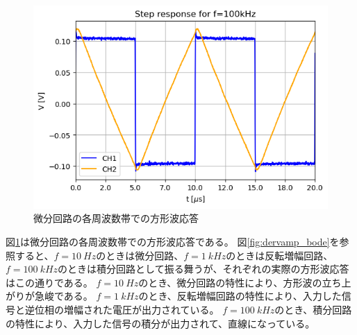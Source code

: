 \documentclass[a4paper]{ltjsarticle}
\begin{document}
\begin{figure}[htbp]
\begin{minipage}{0.48\columnwidth}
        \centering
        \includegraphics[width=0.95\columnwidth]{./images/dervamp_100kHz.png}
    \end{minipage}
    \caption{微分回路の各周波数帯での方形波応答}
    \label{fig:dervamp_square}
\end{figure}
図\ref{fig:dervamp_square}は微分回路の各周波数帯での方形波応答である。
図\ref{fig:dervamp_bode}を参照すると、$f=\SI{10}{Hz}$のときは微分回路、$f=\SI{1}{kHz}$のときは反転増幅回路、$f=\SI{100}{kHz}$のときは積分回路として振る舞うが、それぞれの実際の方形波応答はこの通りである。
$f=\SI{10}{Hz}$のとき、微分回路の特性により、方形波の立ち上がりが急峻である。
$f=\SI{1}{kHz}$のとき、反転増幅回路の特性により、入力した信号と逆位相の増幅された電圧が出力されている。
$f=\SI{100}{kHz}$のとき、積分回路の特性により、入力した信号の積分が出力されて、直線になっている。
\end{document}
